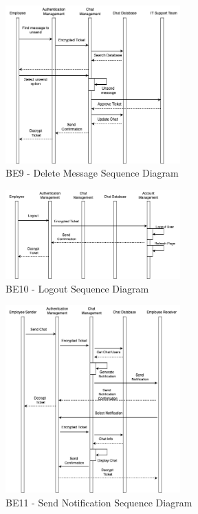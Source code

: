 \documentclass[]{article}
\begin{document}
\begin{figure}[H]
	\centering
	\includegraphics[width=0.6\textwidth]{BE9.png}
	\caption{BE9 - Delete Message Sequence Diagram}
\end{figure}

\begin{figure}[H]
	\centering
	\includegraphics[width=0.6\textwidth]{BE10.png}
	\caption{BE10 - Logout Sequence Diagram}
\end{figure}

\begin{figure}[H]
	\centering
	\includegraphics[width=0.6\textwidth]{BE11.png}
	\caption{BE11 - Send Notification Sequence Diagram}
\end{figure}
\end{document}
